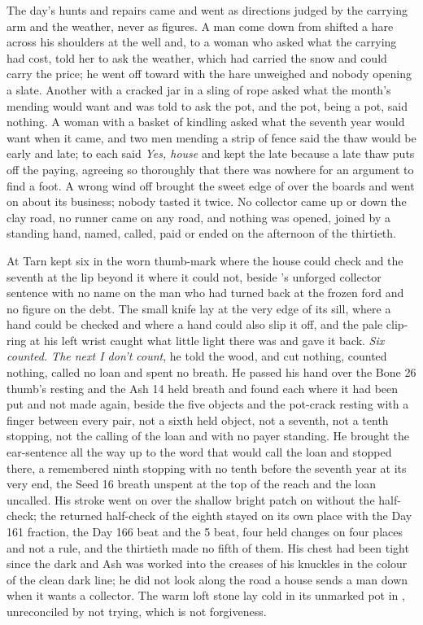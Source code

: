 The day's hunts and repairs came and went as directions judged by the carrying arm and the weather, never as figures. A man come down from  shifted a hare across his shoulders at the well and, to a woman who asked what the carrying had cost, told her to ask the weather, which had carried the snow and could carry the price; he went off toward  with the hare unweighed and nobody opening a slate. Another with a cracked jar in a sling of rope asked what the month's mending would want and was told to ask the pot, and the pot, being a pot, said nothing. A woman with a basket of kindling asked what the seventh year would want when it came, and two men mending a strip of fence said the thaw would be early and late; to each  said \emph{Yes, house} and kept the late because a late thaw puts off the paying, agreeing so thoroughly that there was nowhere for an argument to find a foot. A wrong wind off  brought the sweet edge of  over the boards and went on about its business; nobody tasted it twice. No collector came up or down the clay road, no runner came on any road, and nothing was opened, joined by a standing hand, named, called, paid or ended on the afternoon of the thirtieth.

\scenebreak

At  Tarn kept six in the worn thumb-mark where the house could check and the seventh at the lip beyond it where it could not, beside 's unforged collector sentence with no name on the man who had turned back at the frozen ford and no figure on the debt. The small knife lay at the very edge of its sill, where a hand could be checked and where a hand could also slip it off, and the pale clip-ring at his left wrist caught what little light there was and gave it back. \emph{Six counted. The next I don't count}, he told the wood, and cut nothing, counted nothing, called no loan and spent no breath. He passed his hand over the Bone 26 thumb's resting and the Ash 14 held breath and found each where it had been put and not made again, beside the five objects and the pot-crack resting with a finger between every pair, not a sixth held object, not a seventh, not a tenth stopping, not the calling of the loan and with no payer standing. He brought the ear-sentence all the way up to the word that would call the loan and stopped there, a remembered ninth stopping with no tenth before the seventh year at its very end, the Seed 16 breath unspent at the top of the reach and the loan uncalled. His stroke went on over the shallow bright patch on  without the half-check; the returned half-check of the eighth stayed on its own place with the Day 161 fraction, the Day 166 beat and the  5 beat, four held changes on four places and not a rule, and the thirtieth made no fifth of them. His chest had been tight since the dark and Ash was worked into the creases of his knuckles in the colour of the clean dark line; he did not look along the road a house sends a man down when it wants a collector. The warm loft stone lay cold in its unmarked pot in , unreconciled by not trying, which is not forgiveness.

